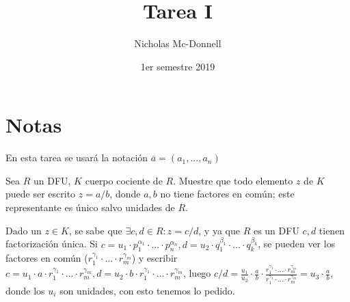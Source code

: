 

\title{Tarea I}
\date{1er semestre 2019}
\author{Nicholas Mc-Donnell}


\maketitle

\clearpage\newpage

\tableofcontents
\newpage

\section*{Notas}
En esta tarea se usará la notación $\overline{a}=(a_1,...,a_n)$

\begin{prob}{1.2}
    Sea $R$ un DFU, $K$ cuerpo cociente de $R$. Muestre que todo elemento $z$ de $K$ puede ser escrito $z=a/b$, donde $a,b$ no tiene factores en común; este representante es único salvo unidades de $R$.
\end{prob}

\begin{sol}{1.2}
    Dado un $z\in K$, se sabe que $\exists c,d\in R: z=c/d$, y ya que $R$ es un DFU $c,d$ tienen factorización única. Si $c=u_1\cdot p_1^{\alpha_1}\cdot...\cdot p_n^{\alpha_n}, d=u_2\cdot q_1^{\beta_1}\cdot...\cdot q_k^{\beta_k}$, se pueden ver los factores en común ($r_1^{\gamma_1}\cdot...\cdot r_m^{\gamma_m}$) y escribir $c=u_1\cdot a\cdot r_1^{\gamma_1}\cdot...\cdot r_m^{\gamma_m}, d=u_2\cdot b\cdot r_1^{\gamma_1}\cdot...\cdot r_m^{\gamma_m}$, luego $c/d=\frac{u_1}{u_2}\cdot\frac{a}{b}\cdot\frac{r_1^{\gamma_1}\cdot...\cdot r_m^{\gamma_m}}{r_1^{\gamma_1}\cdot...\cdot r_m^{\gamma_m}}=u_3\cdot\frac{a}{b}$, donde los $u_i$ son unidades, con esto tenemos lo pedido.
\end{sol}

